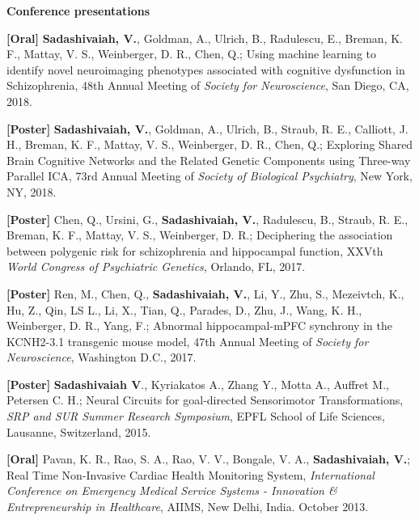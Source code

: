 \documentclass{resume}
\begin{document}
\textbf{\Large Conference presentations}
\begin{presentations}
\item \textbf{[Oral]} \textbf{Sadashivaiah, V.}, Goldman, A., Ulrich, B., Radulescu, E., Breman, K. F., Mattay, V. S., Weinberger, D. R., Chen, Q.; Using machine learning to identify novel neuroimaging phenotypes associated with cognitive dysfunction in Schizophrenia, 48th Annual Meeting of \textit{Society for Neuroscience}, San Diego, CA, 2018.

\item \textbf{[Poster]} \textbf{Sadashivaiah, V.}, Goldman, A., Ulrich, B., Straub, R. E., Calliott, J. H., Breman, K. F., Mattay, V. S., Weinberger, D. R., Chen, Q.; Exploring Shared Brain Cognitive Networks and the Related Genetic Components using Three-way Parallel ICA, 73rd Annual Meeting of \textit{Society of Biological Psychiatry}, New York, NY, 2018.

\item \textbf{[Poster]} Chen, Q., Ursini, G., \textbf{Sadashivaiah, V.}, Radulescu, B., Straub, R. E., Breman, K. F., Mattay, V. S., Weinberger, D. R.; Deciphering the association between polygenic risk for schizophrenia and hippocampal function, XXVth \textit{World Congress of Psychiatric Genetics}, Orlando, FL, 2017.

\item \textbf{[Poster]} Ren, M., Chen, Q., \textbf{Sadashivaiah, V.}, Li, Y., Zhu, S., Mezeivtch, K., Hu, Z.,  Qin, LS L., Li, X., Tian, Q., Parades, D., Zhu, J., Wang, K. H., Weinberger, D. R., Yang, F.; Abnormal hippocampal-mPFC synchrony in the KCNH2-3.1 transgenic mouse model, 47th Annual Meeting of \textit{Society for Neuroscience}, Washington D.C., 2017.

\item \textbf{[Poster]} \textbf{Sadashivaiah V}.,  Kyriakatos A.,  Zhang Y.,  Motta A.,  Auffret M.,  Petersen C. H.; Neural Circuits for goal-directed Sensorimotor Transformations, \textit{SRP and SUR Summer Research Symposium}, EPFL School of Life Sciences, Lausanne, Switzerland, 2015.

\item \textbf{[Oral]} Pavan, K. R., Rao, S. A., Rao, V. V., Bongale, V. A., \textbf{Sadashivaiah, V.}; Real Time Non-Invasive Cardiac Health Monitoring System,  \textit{International Conference on Emergency Medical Service Systems - Innovation \& Entrepreneurship in Healthcare}, AIIMS, New Delhi, India. October 2013.
\end{presentations}
\end{document}
